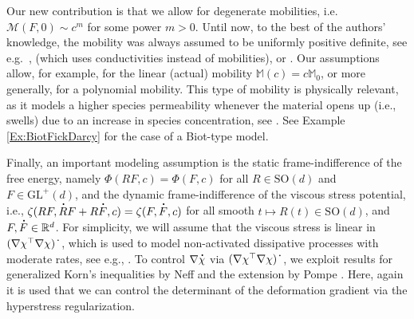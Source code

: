 \documentclass[a4paper,12pt]{article}
\newcommand{\R}{\mathbb{R}}
\newcommand{\M}{\mathbb{M}}
\newcommand{\calM}{\mathcal{M}}
\newcommand\DT[1]{\mathchoice
                 {{\buildrel{\hspace*{.1em}\text{\LARGE.}}\over{#1}}}
                 {{\buildrel{\hspace*{.1em}\text{\Large.}}\over{#1}}}
                 {{\buildrel{\hspace*{.1em}\text{\large.}}\over{#1}}}
                 {{\buildrel{\hspace*{.1em}\text{\large.}}\over{#1}}}}
\renewcommand{\dot}{\DT}
\newcommand{\GL}{\mathrm{GL}}
\theoremstyle{plain}
\theoremstyle{definition}
\numberwithin{equation}{section}
\begin{document}
Our new contribution is that we allow for degenerate mobilities, i.e.\ $\calM(F,0) \sim c^{m}$ for some power $m>0$. Until now, to the best of the authors' knowledge, the mobility was always assumed to be uniformly positive definite, see e.g.\ \cite{Roub2017VMSS,RouTom2020DCEB}, \cite{MieRou2020TVKVR} (which uses conductivities instead of mobilities), 
or \cite{Roub2021CHEC}. 
Our assumptions allow, for example, for the linear (actual) mobility $\M(c)=c\M_0$, or more generally, for a polynomial mobility. This type of mobility is physically relevant, as it models a higher species permeability whenever the material opens up (i.e., swells) due to an increase in species concentration, see \cite{CheAna2010CTFPLDEM}. See Example \ref{Ex:BiotFickDarcy} for the case of a Biot-type model. 




%
%
%
%
%
%
%
%
%
%
%
%
%
%
%
%
%





Finally, an important modeling assumption is the static frame-indifference 
of the free energy, namely $\Phi(RF,c) = \Phi(F,c)$ for all $R\in\mathrm{SO}(d)$ and 
$F\in\GL^+(d)$, and the dynamic frame-indifference of the 
viscous stress potential, i.e., $\zeta(RF,\dot R F+R\dot F,c)=\zeta(F,\dot F,c)$ for all smooth $t\mapsto R(t)\in\mathrm{SO}(d)$,
and $F,\dot F\in \R^d$. 
For simplicity, we will assume 
that the viscous stress is linear in $(\nabla\chi^\top\nabla\chi)^{\dot{}}$, 
which is used to model non-activated dissipative processes with moderate rates, 
see e.g., \cite[Sect.]{MieRou2020TVKVR}. To control $\nabla\dot\chi$ via $(\nabla\chi^\top\nabla\chi)^{\dot{}}$, we exploit results for generalized Korn's inequalities by Neff \cite{Neff2002KFIN} and the extension by Pompe \cite{Pomp2003KFIV}. 
Here, again it is used that we can control the determinant of the deformation gradient via the hyperstress regularization.
\end{document}
